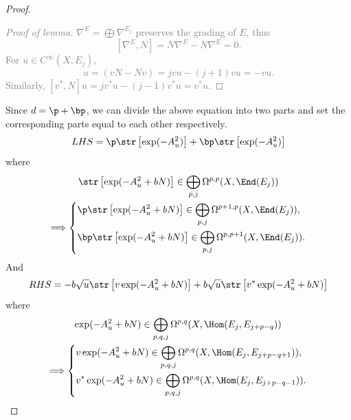 \begin{proof}
\begin{lemma}
    \end{lemma}
    \textcolor{gray}{
        \begin{proof}[Proof of lemma]
        $\nabla^E = \bigoplus \nabla^{E_j}$ preserves the grading of $E$, 
        thus 
        \[
        [\nabla^E,N]=N\nabla^E-N\nabla^E=0.
        \]
        For $u\in C^\infty(X,E_j)$, 
        \begin{equation*}
            [v,N]u = (vN-Nv) = jv u - (j+1)v u = -v u. 
        \end{equation*}
        Similarly, $[v^*,N]u = jv^* u - (j-1)v^* u = v^* u$.
        \end{proof}
    }
    Since $d=\p+\bp$, we can divide the above equation into two parts and 
    set the corresponding parts equal to each other respectively.
    \begin{equation*}
        LHS = \p\str\left[\exp(-A_u^2)\right] + 
        \bp\str\left[\exp(-A_u^2)\right]
    \end{equation*}
    where 
    \begin{gather*}
    \str\left[\exp(-A_u^2+bN)\right] \in 
    \bigoplus_{p,j}\Omega^{p,p}(X,\End(E_j)) \\
    \Longrightarrow
    \left\{
        \begin{aligned}
            &\p\str\left[\exp(-A_u^2+bN)\right] \in 
            \bigoplus_{p,j}\Omega^{p+1,p}(X,\End(E_j)), \\
            &\bp\str\left[\exp(-A_u^2+bN)\right] \in 
            \bigoplus_{p,j}\Omega^{p,p+1}(X,\End(E_j)).
        \end{aligned}
    \right.
    \end{gather*}
    And
    \begin{equation*}
        RHS = -b\sqrt{u}\str\left[v\exp(-A_u^2+bN)\right]
        + b\sqrt{u}\str\left[v^*\exp(-A_u^2+bN)\right]
    \end{equation*}
    where
    \begin{gather*}
        \exp(-A_u^2+bN)\in\bigoplus_{p,q,j}\Omega^{p,q}(X,\Hom(E_j,E_{j+p-q})) \\
        \Longrightarrow
        \left\{
            \begin{aligned}
                &v\exp(-A_u^2+bN) \in 
                \bigoplus_{p,q,j}\Omega^{p,q}(X,\Hom(E_j,E_{j+p-q+1})), \\
                &v^*\exp(-A_u^2+bN) \in 
                \bigoplus_{p,q,j}\Omega^{p,q}(X,\Hom(E_j,E_{j+p-q-1})).
            \end{aligned}
        \right. \\

\end{gather*}
\end{proof}
